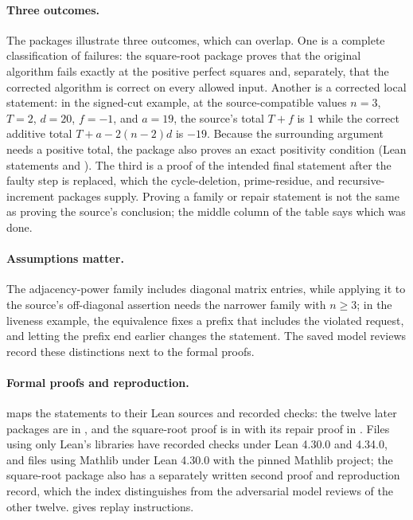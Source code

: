 \paragraph{Three outcomes.}
The packages illustrate three outcomes, which can overlap. One is a complete classification of failures: the square-root package proves that the original algorithm fails exactly at the positive perfect squares and, separately, that the corrected algorithm is correct on every allowed input. Another is a corrected local statement: in the signed-cut example, at the source-compatible values $n=3$, $T=2$, $d=20$, $f=-1$, and $a=19$, the source's total $T+f$ is $1$ while the correct additive total $T+a-2(n-2)d$ is $-19$. Because the surrounding argument needs a positive total, the package also proves an exact positivity condition (Lean statements  and ). The third is a proof of the intended final statement after the faulty step is replaced, which the cycle-deletion, prime-residue, and recursive-increment packages supply. Proving a family or repair statement is not the same as proving the source's conclusion; the middle column of the table says which was done.

\paragraph{Assumptions matter.}
The adjacency-power family includes diagonal matrix entries, while applying it to the source's off-diagonal assertion needs the narrower family with $n\ge3$; in the liveness example, the equivalence fixes a prefix that includes the violated request, and letting the prefix end earlier changes the statement. The saved model reviews record these distinctions next to the formal proofs.

\paragraph{Formal proofs and reproduction.}
 maps the statements to their Lean sources and recorded checks: the twelve later packages are in , and the square-root proof is in  with its repair proof in . Files using only Lean's libraries have recorded checks under Lean 4.30.0 and 4.34.0, and files using Mathlib under Lean 4.30.0 with the pinned Mathlib project; the square-root package also has a separately written second proof and reproduction record, which the index distinguishes from the adversarial model reviews of the other twelve.  gives replay instructions.
